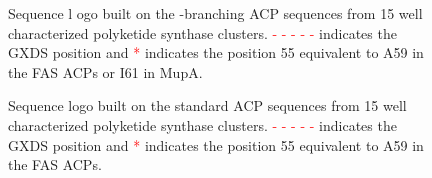 		\setlength\fboxsep{5pt}
		\setlength\fboxrule{1.5pt}
		\begin{figure}[htbp]
		\centering
		\caption[Sequence logo built on the \bet-branching ACP sequences from 15 well characterized polyketide synthase clusters.]{Sequence l ogo built on the \bet-branching ACP sequences from 15 well characterized polyketide synthase clusters. \textcolor{red}{- - - - -} indicates the GXDS position and \textcolor{red}{*} indicates the position 55 equivalent to A59 in the FAS ACPs or I61 in MupA.}
		\label{fig:branchingacplogo}
		\end{figure}			
		
		\setlength\fboxsep{5pt}
		\setlength\fboxrule{1.5pt}
		\begin{figure}[htbp]
		\centering
		\caption[Sequence logo built on the standard ACP sequences from 15 well characterized polyketide synthase clusters.]{Sequence logo built on the standard ACP sequences from 15 well characterized polyketide synthase clusters. \textcolor{red}{- - - - -} indicates the GXDS position and \textcolor{red}{*} indicates the position 55 equivalent to A59 in the FAS ACPs.}
		\label{fig:standardacplogo}
		\end{figure}			

\newpage					
